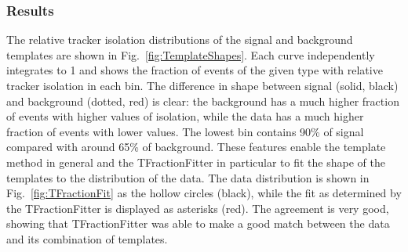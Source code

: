 \subsubsection{Results}
\label{anMeth:BGSubTemplateResults}


The relative tracker isolation distributions of the 
signal and background templates are shown in 
Fig.~\ref{fig:TemplateShapes}.  
Each curve independently integrates to 1
and shows the fraction of events of the given type
with relative tracker isolation in each bin.
The difference in shape between signal (solid, black) 
and background (dotted, red)
is clear:
the background has a much higher fraction of events
with higher values of isolation,
while the data has a much higher fraction of events
with lower values.
The lowest bin contains 90\% of signal compared with
around 65\% of background.
These features enable the template method in general 
and the TFractionFitter in particular 
to fit the shape of the templates to the 
distribution of the data.  
The data distribution is shown in 
Fig.~\ref{fig:TFractionFit} 
as the hollow circles (black), 
while the fit as determined by the
TFractionFitter is displayed as asterisks (red).  
The agreement is very good, showing that 
TFractionFitter was able to make a good 
match between the data and its combination 
of templates.  

